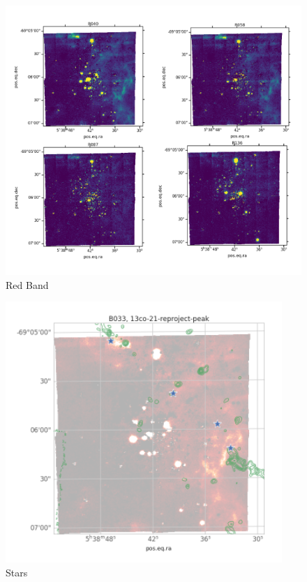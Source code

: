 \documentclass[useAMS, usenatbib, a4paper]{mnras}
\begin{document}
\begin{figure}
\centering
\includegraphics[width=\columnwidth]{Figures/R_band.png}
\caption{Red Band}
\label{fig:RB}
\end{figure}

\begin{figure}
\centering
\includegraphics[width=\columnwidth]{Figures/stars.png}
\caption{Stars}
\label{fig:stars}
\end{figure}
\end{document}
